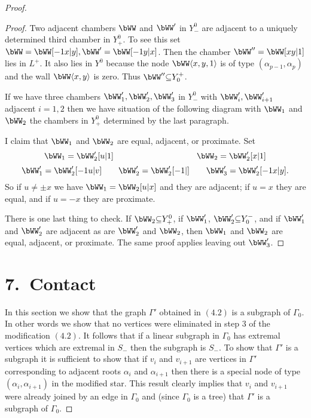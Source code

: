 \documentclass{memo-l}
\theoremstyle{definition}
\theoremstyle{remark}
\numberwithin{section}{chapter}
\numberwithin{equation}{chapter}
\begin{document}
\begin{proof}
\begin{proof}
   Two adjacent chambers $\bWW$ and $\bWW'$ in $Y_{-}^{0}$ are
adjacent to a uniquely determined third chamber in $Y_{+}^{0}$.  To see
this set $\bWW = \bWW[-1x\vert y], \bWW' = \bWW[-1y\vert x]$.
Then the chamber $\bWW'' = \bWW[xy\vert 1]$ lies in $L^{+}$.  It also
lies in $Y^{0}$ because the node $\bWW \langle x,y,1\rangle $ is of type
$({\alpha}_{p-1},{\alpha}_{p})$ and the wall $\bWW \langle x,y\rangle $ is zero.  Thus
$\bWW'' {\subseteq} Y_{0}^{+}$.

\medskip
\medskip

   If we have three chambers $\bWW _{1}', 
\bWW _{2}', \bWW _{3}'$ in
$Y^{0}_{-}$ with $\bWW _{i}', 
\bWW '_{i+1}$ adjacent $i=1,2$ then we
have situation of the following diagram with $\bWW _{1}$ and 
$\bWW_{2}$
the chambers in $Y_{+}^{0}$ determined by the last paragraph.

\medskip
\medskip

   I claim that $\bWW_{1}$ and $\bWW_{2}$ 
are equal, adjacent, or
proximate.  Set 
$$
\bWW_{1} = \bWW_{2}'[u\vert 1] 
\qquad \qquad \qquad \qquad \qquad
\bWW_{2} = \bWW_{2}'[x\vert 1]
$$
$$
\bWW_{1}' = \bWW_{2}'[-1u\vert v] \qquad
\bWW_{2}' = \bWW_{2}'[-1\vert ] \qquad
\bWW_{3}' = \bWW_{2}'[-1x\vert y] .
$$ 
So if $u\ne {\pm}x$ we have $\bWW_{1} = 
\bWW_{2}[u\vert x]$ and they are
adjacent; if $u = x$ they are equal, and if $u = - x$ they are proximate.


   There is one last thing to check.  If $\bWW_{2}{\subseteq} Y_{+}^{0}$,
if $\bWW_{1}'$, $\bWW_{2}'{\subseteq}Y_{0}^{-}$, and if $\bWW_{1}'$
and $\bWW_{2}'$ are adjacent as are $\bWW_{2}'$ and $\bWW_{2}$, then
$\bWW_{1}$ and $\bWW_{2}$ are equal, adjacent, or proximate.  The same
proof applies leaving out $\bWW_{3}'$.
\end{proof} 

\section{{7.\ Contact}}

   In this section we show that the graph ${\Gamma}'$ obtained in $(4.2)$
is a subgraph of ${\Gamma}_{0}$.  In other words we show that no vertices
were eliminated in step $3$ of the modification $(4.2)$.  It follows that
if a linear subgraph in ${\Gamma}_{0}$ has extremal vertices which are
extremal in $S_{-}$ then the subgraph is $S_{-}$.  To show that ${\Gamma}'$
is a subgraph it is sufficient to show that if $v_{i}$ and $v_{i+1}$ are
vertices in ${\Gamma}'$ corresponding to adjacent roots ${\alpha}_{i}$ and
${\alpha}_{i+1}$ then there is a special node of type
$({\alpha}_{i},{\alpha}_{i+1})$ in the modified star.  This result clearly
implies that $v_{i}$ and $v_{i+1}$ were already joined by an edge in
${\Gamma}_{0}$ and (since ${\Gamma}_{0}$ is a tree) that ${\Gamma}'$ is a
subgraph of ${\Gamma}_{0}$.


\end{proof}
\end{document}
